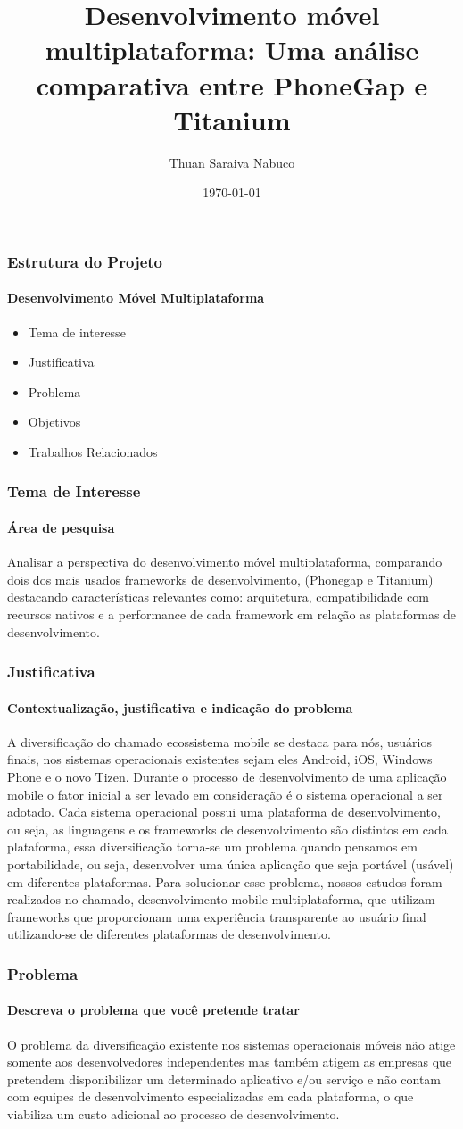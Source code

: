 \documentclass[10pt]{beamer}
\title{Desenvolvimento móvel multiplataforma: Uma análise comparativa entre PhoneGap e Titanium}
\author{Thuan Saraiva Nabuco}
\institute{Universidade Estadual do Ceará}
\date{\today}
\begin{document}
\titlepage
\begin{frame}
	\frametitle{Estrutura do Projeto}
	\framesubtitle{Desenvolvimento Móvel Multiplataforma}
	\begin{itemize}
		\item Tema de interesse
		\item Justificativa
		\item Problema
		\item Objetivos
		\item Trabalhos Relacionados
	\end{itemize}
\end{frame}

\begin{frame}
	\frametitle{Tema de Interesse}
	\framesubtitle{Área de pesquisa}
	Analisar a perspectiva do desenvolvimento móvel multiplataforma, comparando dois dos mais usados frameworks de desenvolvimento, (Phonegap e Titanium) destacando características relevantes como: arquitetura, compatibilidade com recursos nativos e a performance de cada framework em relação as plataformas de desenvolvimento.
\end{frame}

\begin{frame}[t]
	\frametitle{Justificativa}
	\framesubtitle{Contextualização, justificativa e indicação do problema}
	 A diversificação do chamado ecossistema mobile se destaca para nós, usuários finais, nos sistemas operacionais existentes sejam eles Android, iOS, Windows Phone e o novo Tizen. Durante o processo de desenvolvimento de uma aplicação mobile o fator inicial a ser levado em consideração é o sistema operacional a ser adotado. Cada sistema operacional possui uma plataforma de desenvolvimento, ou seja, as linguagens e os frameworks de desenvolvimento são distintos em cada plataforma, essa diversificação torna-se um problema quando pensamos em portabilidade, ou seja, desenvolver uma única aplicação que seja portável (usável) em diferentes plataformas. Para solucionar esse problema, nossos estudos foram realizados no chamado, desenvolvimento mobile multiplataforma, que utilizam frameworks que proporcionam uma experiência transparente ao usuário final utilizando-se de diferentes plataformas de desenvolvimento.
\end{frame}

\begin{frame}
	\frametitle{Problema}
	\framesubtitle{Descreva o problema que você pretende tratar}
	O problema da diversificação existente nos sistemas operacionais móveis não atige somente aos desenvolvedores independentes mas também atigem as empresas que pretendem disponibilizar um determinado aplicativo e/ou serviço e não contam com equipes de desenvolvimento especializadas em cada plataforma, o que viabiliza um custo adicional ao processo de desenvolvimento.
\end{frame}
\end{document}
